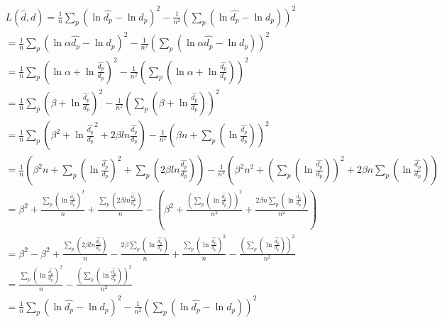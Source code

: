 \pagebreak


\begin{align*}
    L(\hat{d}, d) = \frac{1}{n}\sum_{p} (\ln{\hat{d_p}} - \ln{d_p})^2 - \frac{1}{n^2} \left( \sum_{p} (\ln{\hat{d_p}} - \ln{d_p}) \right)^2 \\
    = \frac{1}{n}\sum_{p} (\ln{\alpha \hat{d_p}} - \ln{d_p})^2 - \frac{1}{n^2} \left( \sum_{p} (\ln{\alpha \hat{d_p}} - \ln{d_p}) \right)^2 \\
    = \frac{1}{n}\sum_{p} (\ln{\alpha} + \ln{\frac{\hat{d_p}}{d_p}})^2 - \frac{1}{n^2} \left( \sum_{p} (\ln{\alpha} + \ln{\frac{\hat{d_p}}{d_p}}) \right)^2 \\
    = \frac{1}{n}\sum_{p} (\beta + \ln{\frac{\hat{d_p}}{d_p}})^2 - \frac{1}{n^2} \left( \sum_{p} (\beta + \ln{\frac{\hat{d_p}}{d_p}}) \right)^2 \\
    = \frac{1}{n}\sum_{p} (\beta^2 + \ln{\frac{\hat{d_p}}{d_p}}^2 + 2 \beta ln{\frac{\hat{d_p}}{d_p}}) - \frac{1}{n^2} \left( \beta n + \sum_{p} (\ln{\frac{\hat{d_p}}{d_p}}) \right)^2 \\
    = \frac{1}{n} (\beta^2 n + \sum_{p}(\ln{\frac{\hat{d_p}}{d_p}})^2 + \sum_{p}(2 \beta ln{\frac{\hat{d_p}}{d_p}})) - \frac{1}{n^2} \left( \beta^2 n^2 + (\sum_{p} (\ln{\frac{\hat{d_p}}{d_p}}))^2 + 2 \beta n \sum_{p} (\ln{\frac{\hat{d_p}}{d_p}}) \right) \\
    = \beta^2 + \frac{\sum_{p}(\ln{\frac{\hat{d_p}}{d_p}})^2}{n} + \frac{\sum_{p}(2 \beta ln{\frac{\hat{d_p}}{d_p}})}{n} - \left( \beta^2 + \frac{(\sum_{p} (\ln{\frac{\hat{d_p}}{d_p}}))^2}{n^2} + \frac{2 \beta n \sum_{p} (\ln{\frac{\hat{d_p}}{d_p}})}{n^2} \right) \\
    = \beta^2 - \beta^2 + \frac{\sum_{p}(2 \beta ln{\frac{\hat{d_p}}{d_p}})}{n} - \frac{2 \beta \sum_{p} (\ln{\frac{\hat{d_p}}{d_p}})}{n} + \frac{\sum_{p}(\ln{\frac{\hat{d_p}}{d_p}})^2}{n} - \frac{(\sum_{p} (\ln{\frac{\hat{d_p}}{d_p}}))^2}{n^2} \\
    = \frac{\sum_{p}(\ln{\frac{\hat{d_p}}{d_p}})^2}{n} - \frac{(\sum_{p} (\ln{\frac{\hat{d_p}}{d_p}}))^2}{n^2} \\
    = \frac{1}{n}\sum_{p} (\ln{\hat{d_p}} - \ln{d_p})^2 - \frac{1}{n^2} \left( \sum_{p} (\ln{\hat{d_p}} - \ln{d_p}) \right)^2 \\
\end{align*}